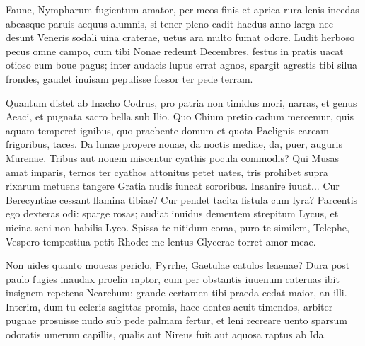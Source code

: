 \documentclass{book}
\newenvironment {carmen} [1] [\relax] 
  {\Titulus \Versus \incipit*\numerus{1}#1}
  {\endVersus}
\newcommand {\Sapphic}   {\Forma \strophae {0 \poena 00 \poena 1}}
\newcommand {\GlycAscl}  {\Forma \strophae {2 \poena 0}}
\begin{document}
\begin{carmen}[\Sapphic]


Faune, Nympharum fugientum amator,
 per meos finis et aprica rura
 lenis incedas abeasque paruis
      aequus alumnis, 
si tener pleno cadit haedus anno               
 larga nec desunt Veneris sodali
 uina craterae, uetus ara multo
      fumat odore. 
Ludit herboso pecus omne campo,
 cum tibi Nonae redeunt Decembres,               
 festus in pratis uacat otioso
      cum boue pagus; 
inter audacis lupus errat agnos,
 spargit agrestis tibi silua frondes,
 gaudet inuisam pepulisse fossor               
      ter pede terram. 

\end{carmen}

\begin{carmen}[\GlycAscl]


     Quantum distet ab Inacho
 Codrus, pro patria non timidus mori,
      narras, et genus Aeaci,
 et pugnata sacro bella sub Ilio.
      Quo Chium pretio cadum               
 mercemur, quis aquam temperet ignibus,
      quo praebente domum et quota
 Paelignis caream frigoribus, taces.
      Da lunae propere nouae,
 da noctis mediae, da, puer, auguris               
      Murenae. Tribus aut nouem
 miscentur cyathis pocula commodis?
      Qui Musas amat imparis,
 ternos ter cyathos attonitus petet
 uates, tris prohibet supra               
 rixarum metuens tangere Gratia
      nudis iuncat sororibus.
 Insanire iuuat... Cur Berecyntiae
      cessant flamina tibiae?
 Cur pendet tacita fistula cum lyra?               
      Parcentis ego dexteras
 odi: sparge rosas; audiat inuidus
      dementem strepitum Lycus,
 et uicina seni non habilis Lyco.
      Spissa te nitidum coma,               
 puro te similem, Telephe, Vespero
      tempestiua petit Rhode:
 me lentus Glycerae torret amor meae. 

\end{carmen}

\begin{carmen}[\Sapphic]


Non uides quanto moueas periclo,
 Pyrrhe, Gaetulae catulos leaenae?
 Dura post paulo fugies inaudax
      proelia raptor, 
cum per obstantis iuuenum cateruas               
 ibit insignem repetens Nearchum:
 grande certamen tibi praeda cedat
      maior, an illi. 
Interim, dum tu celeris sagittas
 promis, haec dentes acuit timendos,               
 arbiter pugnae prosuisse nudo
      sub pede palmam 
fertur, et leni recreare uento
 sparsum odoratis umerum capillis,
 qualis aut Nireus fuit aut aquosa               
      raptus ab Ida. 

\end{carmen}
\end{document}
